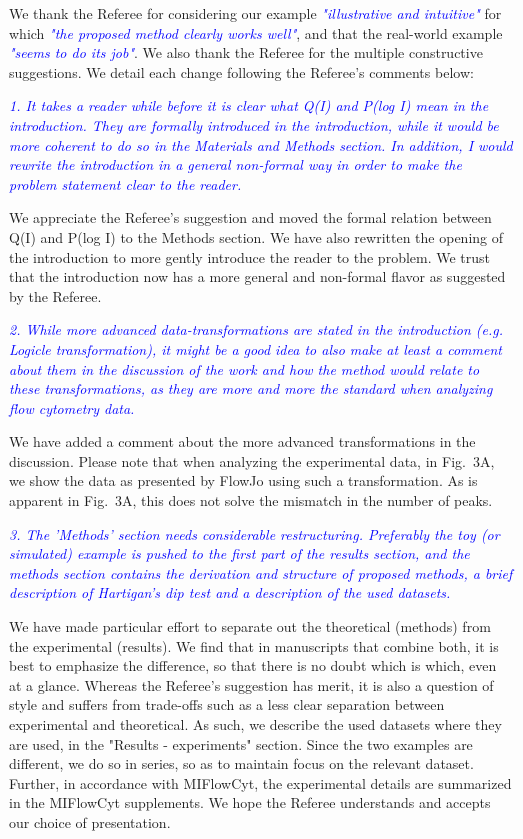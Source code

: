 \documentclass[letter,11pt,draft]{article}
\newcommand{\re}[1]{\emph{\textcolor{blue}{#1}}}
\begin{document}
We thank the Referee for considering our example \re{"illustrative and intuitive"} for which \re{"the proposed method clearly works well"}, and that the real-world example \re{"seems to do its job"}. We also thank the Referee for the multiple constructive suggestions. We detail each change following the Referee's comments below:

\smallskip

\re{1. It takes a reader while before it is clear what Q(I) and P(log I) mean in the introduction. They are formally introduced in the introduction, while it would be more coherent to do so in the Materials and Methods section. In addition, I would rewrite the introduction in a general non-formal way in order to make the problem statement clear to the reader.}

\smallskip
We appreciate the Referee's suggestion and moved the formal relation between Q(I) and P(log I) to the Methods section. We have also rewritten the opening of the introduction to more gently introduce the reader to the problem. We trust that the introduction now has a more general and non-formal flavor as suggested by the Referee.

\re{2. While more advanced data-transformations are stated in the introduction (e.g. Logicle transformation), it might be a good idea to also make at least a comment about them in the discussion of the work and how the method would relate to these transformations, as they are more and more the standard when analyzing flow cytometry data.}

\smallskip
We have added a comment about the more advanced transformations in the discussion. Please note that when analyzing the experimental data, in Fig.~3A, we show the data as presented by FlowJo using such a transformation. As is apparent in Fig.~3A, this does not solve the mismatch in the number of peaks. 

\re{3. The 'Methods' section needs considerable restructuring. Preferably the toy (or simulated) example is pushed to the first part of the results section, and the methods section contains the derivation and structure of proposed methods, a brief description of Hartigan's dip test and a description of the used datasets.}

\smallskip
We have made particular effort to separate out the theoretical (methods) from the experimental (results). We find that in manuscripts that combine both, it is best to emphasize the difference, so that there is no doubt which is which, even at a glance. Whereas the Referee's suggestion has merit, it is also a question of style and suffers from trade-offs such as a less clear separation between experimental and theoretical. As such, we describe the used datasets where they are used, in the "Results - experiments" section. Since the two examples are different, we do so in series, so as to maintain focus on the relevant dataset. Further, in accordance with MIFlowCyt, the experimental details are summarized in the MIFlowCyt supplements. We hope the Referee understands and accepts our choice of presentation.
\end{document}
